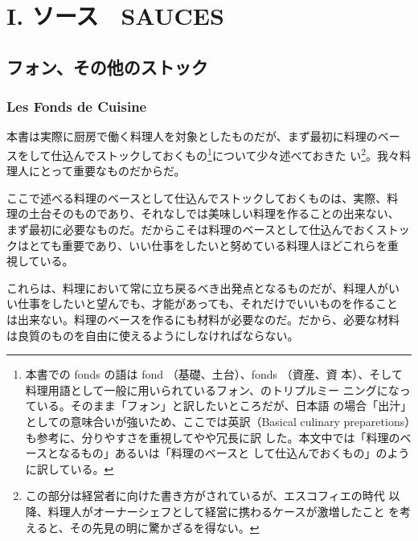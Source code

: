\documentclass[twoside,12Q,b5j]{escoffierltjsbook}
\date{}
\renewcommand{\thechapter}{}
\renewcommand{\thesection}{}
\begin{document}







\chapter{I. ソース　SAUCES}\label{sauce}

\section{フォン、その他のストック}\label{ux30d5ux30a9ux30f3ux305dux306eux4ed6ux306eux30b9ux30c8ux30c3ux30af}

\subsection{Les Fonds de Cuisine}\label{les-fonds-de-cuisine}

 

本書は実際に厨房で働く料理人を対象としたものだが、まず最初に料理のベー
スをして仕込んでストックしておくもの\footnote{本書での fonds の語は fond
  （基礎、土台）、fonds （資産、資
  本）、そして料理用語として一般に用いられているフォン、のトリプルミー
  ニングになっている。そのまま「フォン」と訳したいところだが、日本語
  の場合「出汁」としての意味合いが強いため、ここでは英訳（Basical
  culinary preparetions）も参考に、分りやすさを重視してやや冗長に訳
  した。本文中では「料理のベースとなるもの」あるいは「料理のベースと
  して仕込んでおくもの」のように訳している。}について少々述べておきた
い\footnote{この部分は経営者に向けた書き方がされているが、エスコフィエの時代
  以降、料理人がオーナーシェフとして経営に携わるケースが激増したこと
  を考えると、その先見の明に驚かざるを得ない。}。我々料理人にとって重要なものだからだ。

ここで述べる料理のベースとして仕込んでストックしておくものは、実際、料
理の土台そのものであり、それなしでは美味しい料理を作ることの出来ない、
まず最初に必要なものだ。だからこそは料理のベースとして仕込んでおくストッ
クはとても重要であり、いい仕事をしたいと努めている料理人ほどこれらを重
視している。

これらは、料理において常に立ち戻るべき出発点となるものだが、料理人がい
い仕事をしたいと望んでも、才能があっても、それだけでいいものを作ること
は出来ない。料理のベースを作るにも材料が必要なのだ。だから、必要な材料
は良質のものを自由に使えるようにしなければならない。
\end{document}
